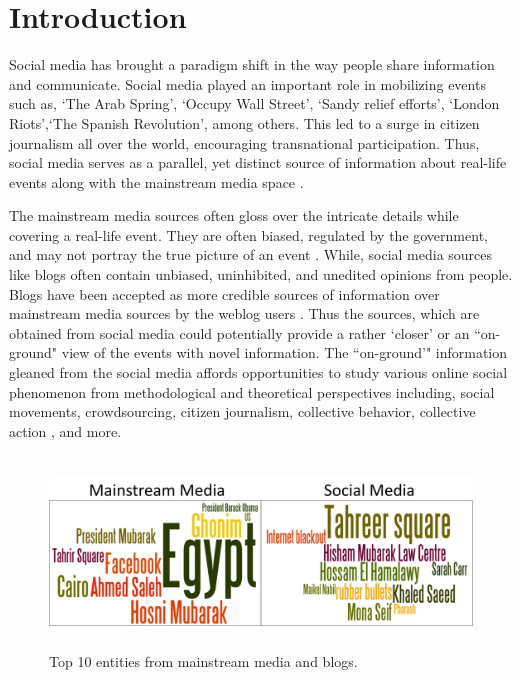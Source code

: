 \section{Introduction}

Social media has brought a paradigm shift in the way people share information and communicate.  Social media played an important role in mobilizing events such as, `The Arab Spring', `Occupy Wall Street', `Sandy relief efforts', `London Riots',`The Spanish Revolution', among others. This led to a surge in citizen journalism all over the world, encouraging transnational participation. Thus, social media serves as a parallel, yet distinct source of information about real-life events along with the mainstream media space \cite{reese2007mapping}.

The mainstream media sources often gloss over the intricate details while covering a real-life event. They are often biased, regulated by the government, and may not portray the true picture of an event \cite{hamdy2012framing}. While, social media sources like blogs often contain unbiased, uninhibited, and unedited opinions from people. Blogs have been accepted as more credible sources of information over mainstream media sources by the weblog users \cite{johnson2004wag}. Thus the sources, which are obtained from social media could potentially provide a rather `closer'  or an ``on-ground" view of the events with novel information. The ``on-ground'" information gleaned from the social media affords opportunities to study various online social phenomenon from methodological and theoretical perspectives including, social movements, crowdsourcing, citizen journalism, collective behavior, collective action \cite{agarwal2011finding,agarwal2012online,agarwal2012raising}, and more.

\begin{figure}[htb]
\centering
\includegraphics[height=2in,width=4.5in]{Figures/Chapter3Figures/comp.pdf}
\caption{Top 10 entities from mainstream media and blogs.}
\label{fg:comp}
\end{figure}

